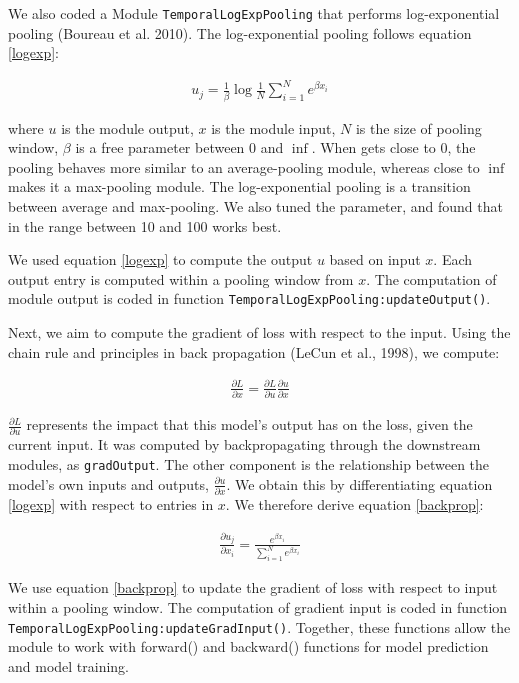 \documentclass{article}
\begin{document}
We also coded a Module \texttt{TemporalLogExpPooling} that performs log-exponential pooling (Boureau et al. 2010). The log-exponential pooling follows equation \ref{logexp}:

\begin{align}
u_j = \frac{1}{\beta} \log{\frac{1}{N} \sum\limits_{i=1}^{N} e^{\beta x_i}}
\label{logexp}
\end{align}

where $u$ is the module output, $x$ is the module input, $N$ is the size of pooling window, $\beta$ is a free parameter between 0 and $\inf$. When  gets close to 0, the pooling behaves more similar to an average-pooling module, whereas close to $\inf$ makes it a max-pooling module. The log-exponential pooling is a transition between average and max-pooling. We also tuned the  parameter, and found that  in the range between 10 and 100 works best. 

We used equation \ref{logexp} to compute the output $u$ based on input $x$. Each output entry is computed within a pooling window from $x$. The computation of module output is coded in function \texttt{TemporalLogExpPooling:updateOutput()}. 

Next, we aim to compute the gradient of loss with respect to the input. Using the chain rule and principles in back propagation (LeCun et al., 1998), we compute:

\begin{align}
\frac{\partial L}{\partial x} = \frac{\partial L}{\partial u} \frac{\partial u}{\partial x}
\label{chainrule}
\end{align}

$\frac{\partial L}{\partial u}$ represents the impact that this model's output has on the loss, given the current input. It was computed by backpropagating through the downstream modules, as \texttt{gradOutput}. The other component is the relationship between the model's own inputs and outputs, $\frac{\partial u}{\partial x}$. We obtain this by differentiating equation \ref{logexp} with respect to entries in $x$. We therefore derive equation \ref{backprop}:

\begin{align}
\frac{\partial u_j}{\partial x_i} = \frac{e^{\beta x_i}}{\sum\limits_{i=1}^{N} e^{\beta x_i}}
\label{backprop}
\end{align}

We use equation \ref{backprop} to update the gradient of loss with respect to input within a pooling window. The computation of gradient input is coded in function \texttt{TemporalLogExpPooling:updateGradInput()}. Together, these functions allow the module to work with forward() and backward() functions for model prediction and model training. 
\end{document}

